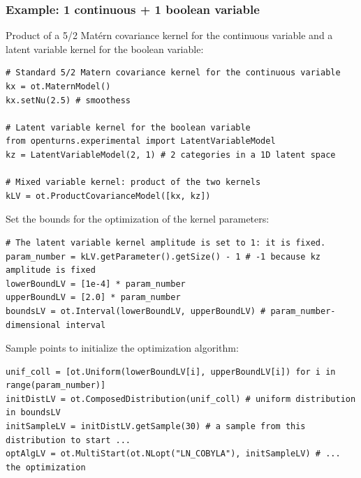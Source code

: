 \documentclass{beamer}
\begin{document}

\begin{frame}[containsverbatim]
\frametitle{Example: 1 continuous + 1 boolean variable}
\small
Product of a 5/2 Mat\'ern covariance kernel for the continuous variable and a latent variable kernel for the boolean variable:

\begin{lstlisting}
# Standard 5/2 Matern covariance kernel for the continuous variable
kx = ot.MaternModel()
kx.setNu(2.5) # smoothess

# Latent variable kernel for the boolean variable
from openturns.experimental import LatentVariableModel
kz = LatentVariableModel(2, 1) # 2 categories in a 1D latent space

# Mixed variable kernel: product of the two kernels
kLV = ot.ProductCovarianceModel([kx, kz])
\end{lstlisting}

Set the bounds for the optimization of the kernel parameters:

\begin{lstlisting}
# The latent variable kernel amplitude is set to 1: it is fixed.
param_number = kLV.getParameter().getSize() - 1 # -1 because kz amplitude is fixed
lowerBoundLV = [1e-4] * param_number
upperBoundLV = [2.0] * param_number
boundsLV = ot.Interval(lowerBoundLV, upperBoundLV) # param_number-dimensional interval
\end{lstlisting}

Sample points to initialize the optimization algorithm:
\begin{lstlisting}
unif_coll = [ot.Uniform(lowerBoundLV[i], upperBoundLV[i]) for i in range(param_number)]
initDistLV = ot.ComposedDistribution(unif_coll) # uniform distribution in boundsLV
initSampleLV = initDistLV.getSample(30) # a sample from this distribution to start ...
optAlgLV = ot.MultiStart(ot.NLopt("LN_COBYLA"), initSampleLV) # ... the optimization
\end{lstlisting}

\end{frame}

\end{document}
